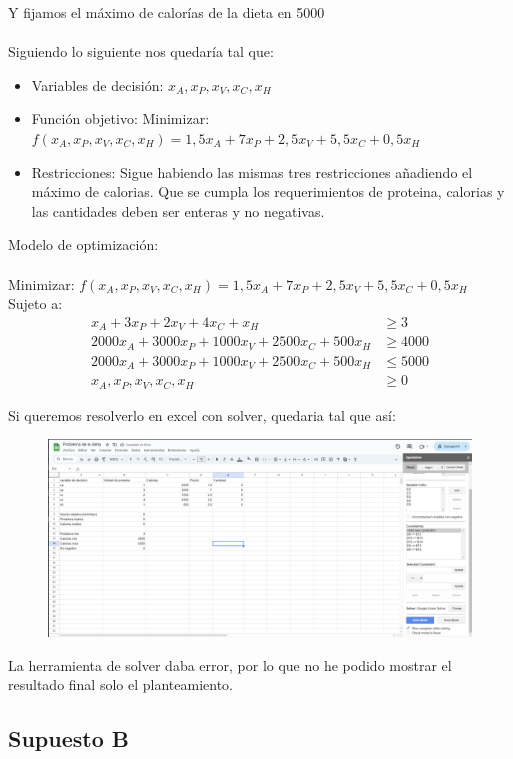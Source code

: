 \documentclass[12pt]{article}
\begin{document}
Y fijamos el máximo de calorías de la dieta en 5000
\\\\
Siguiendo lo siguiente nos quedaría tal que:

\begin{itemize}
    \item Variables de decisión: \( x_A, x_P, x_V, x_C, x_H \)
    \item Función objetivo: Minimizar: \( f(x_A, x_P, x_V, x_C, x_H) = 1,5x_A + 7x_P + 2,5x_V + 5,5x_C + 0,5x_H \)
    \item Restricciones: Sigue habiendo las mismas tres restricciones añadiendo el máximo de calorias. Que se cumpla los requerimientos de 
    proteina, calorias y las cantidades deben ser enteras y no negativas.
\end{itemize}

Modelo de optimización:
\\\\
Minimizar: \( f(x_A, x_P, x_V, x_C, x_H) = 1,5x_A + 7x_P + 2,5x_V + 5,5x_C + 0,5x_H\)
\\
Sujeto a: 
\begin{align*}
    x_A + 3x_P + 2x_V + 4x_C + x_H & \geq 3 \\
    2000x_A + 3000x_P + 1000x_V + 2500x_C + 500x_H & \geq 4000 \\
    2000x_A + 3000x_P + 1000x_V + 2500x_C + 500x_H & \leq 5000 \\
    x_A, x_P, x_V, x_C, x_H & \geq 0
\end{align*}

Si queremos resolverlo en excel con solver, quedaria tal que así:
\begin{figure}[h!]
    \centering
    \includegraphics[width=.6\textwidth]{supuestoA.PNG}
    \label{fig:my_label}
\end{figure}

La herramienta de solver daba error, por lo que no he podido mostrar el resultado final solo el planteamiento.
\clearpage
\subsection{Supuesto B}
\end{document}
